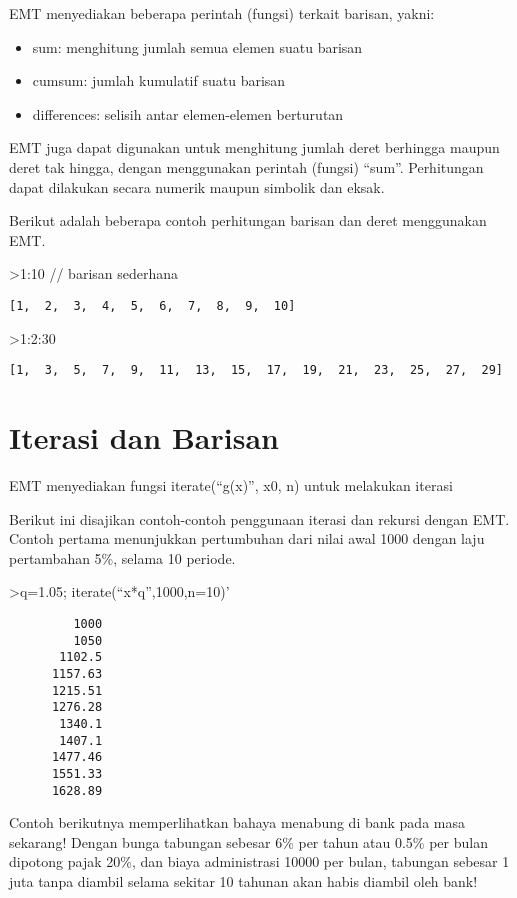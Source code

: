 \documentclass[
]{book}
\begin{document}
EMT menyediakan beberapa perintah (fungsi) terkait barisan, yakni:

\begin{itemize}
\item
  sum: menghitung jumlah semua elemen suatu barisan
\item
  cumsum: jumlah kumulatif suatu barisan
\item
  differences: selisih antar elemen-elemen berturutan
\end{itemize}

EMT juga dapat digunakan untuk menghitung jumlah deret berhingga maupun deret tak hingga, dengan menggunakan perintah (fungsi) ``sum''. Perhitungan dapat dilakukan secara numerik maupun simbolik dan eksak.

Berikut adalah beberapa contoh perhitungan barisan dan deret menggunakan EMT.

\textgreater1:10 // barisan sederhana

\begin{verbatim}
[1,  2,  3,  4,  5,  6,  7,  8,  9,  10]
\end{verbatim}

\textgreater1:2:30

\begin{verbatim}
[1,  3,  5,  7,  9,  11,  13,  15,  17,  19,  21,  23,  25,  27,  29]
\end{verbatim}

\section{Iterasi dan Barisan}\label{iterasi-dan-barisan}

EMT menyediakan fungsi iterate(``g(x)'', x0, n) untuk melakukan iterasi

Berikut ini disajikan contoh-contoh penggunaan iterasi dan rekursi dengan EMT. Contoh pertama menunjukkan pertumbuhan dari nilai awal 1000 dengan laju pertambahan 5\%, selama 10 periode.

\textgreater q=1.05; iterate(``x*q'',1000,n=10)'

\begin{verbatim}
         1000 
         1050 
       1102.5 
      1157.63 
      1215.51 
      1276.28 
       1340.1 
       1407.1 
      1477.46 
      1551.33 
      1628.89 
\end{verbatim}

Contoh berikutnya memperlihatkan bahaya menabung di bank pada masa sekarang! Dengan bunga tabungan sebesar 6\% per tahun atau 0.5\% per bulan dipotong pajak 20\%, dan biaya administrasi 10000 per bulan, tabungan sebesar 1 juta tanpa diambil selama sekitar 10 tahunan akan habis diambil oleh bank!
\end{document}
